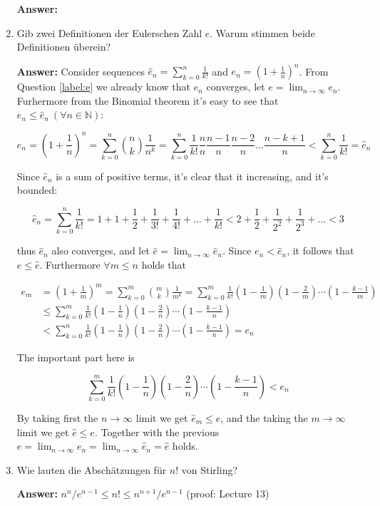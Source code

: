 \documentclass[11pt]{article}
\newcommand{\sumn}[4]{\sum_{#1=#2}^{#3}{#4}}
\newcommand{\NN}[0]{\mathbb{N}}
\newcommand{\slim}[2]{\lim_{#1\to\infty}{#2}}
\begin{document}
\begin{enumerate}
    \textbf{Answer:}
    \item Gib zwei Definitionen der Eulerschen Zahl $e$. Warum stimmen beide Definitionen überein?

    \textbf{Answer:} Consider sequences $\hat{e}_n = \sumn{k}{0}{n}{\frac{1}{k!}}$ and $e_n = \left(1 + \frac{1}{n}\right)^n$.  From Question \ref{label:e} we already know that $e_n$ converges, let $e = \slim{n}{e_n}$. Furhermore from the Binomial theorem it's easy to see that $e_n \le \hat{e}_n~(\forall n\in\NN)$:

    $$e_n = \left(1+\frac{1}{n}\right)^n = \sumn{k}{0}{n}{\binom{n}{k}}\frac{1}{n^k} = \sumn{k}{0}{n}{\frac{1}{k!}\frac{n}{n} \frac{n-1}{n} \frac{n-2}{n} \dots \frac{n-k+1}{n}} < \sumn{k}{0}{n}{\frac{1}{k!}} = \hat{e}_n$$

    Since $\hat{e}_n$ is a sum of positive terms, it's clear that it increasing, and it's bounded:

    $$\hat{e}_n = \sumn{k}{0}{n}{\frac{1}{k!}} = 1 + 1 + \frac{1}{2} + \frac{1}{3!} + \frac{1}{4!} + \dots + \frac{1}{k!} < 2 + \frac{1}{2} + \frac{1}{2^2} + \frac{1}{2^3} + \dots < 3$$

    thus $\hat{e}_n$ also converges, and let $\hat{e} = \slim{n}{\hat{e}_n}$. Since $e_n < \hat{e}_n$, it follows that $e \le \hat{e}$. Furthermore $\forall m \le n$ holds that

    $$\begin{aligned}
        e_m &= \left(1+\frac{1}{m}\right)^m =\sumn{k}{0}{m}{\binom{m}{k}}\frac{1}{m^k} = \sumn{k}{0}{m}{\frac{1}{k!}\left(1 -\frac{1}{m}\right)\left(1 - \frac{2}{m}\right)\cdots\left(1 - \frac{k-1}{m}\right)} \\
        &\le \sumn{k}{0}{m}{\frac{1}{k!}\left(1 -\frac{1}{n}\right)\left(1 - \frac{2}{n}\right)\cdots\left(1 - \frac{k-1}{n}\right)} \\
        &< \sumn{k}{0}{n}{\frac{1}{k!}\left(1 -\frac{1}{n}\right)\left(1 - \frac{2}{n}\right)\cdots\left(1 - \frac{k-1}{n}\right)} = e_n
    \end{aligned}$$

    The important part here is

    $$\sumn{k}{0}{m}{\frac{1}{k!}\left(1 -\frac{1}{n}\right)\left(1 - \frac{2}{n}\right)\cdots\left(1 - \frac{k-1}{n}\right)} < e_n$$

    By taking first the $n\to\infty$ limit we get $\hat{e}_m \le e$, and the taking the $m\to\infty$ limit we get $\hat{e} \le e$. Together with the previous $e = \slim{n}{e_n} = \slim{n}{\hat{e}_n} = \hat{e}$ holds.
    \item Wie lauten die Abschätzungen für $n!$ von Stirling?

    \textbf{Answer:} $n^n/e^{n-1} \le n! \le n^{n+1}/e^{n-1}$ (proof: Lecture 13)
\end{enumerate}
\end{document}
